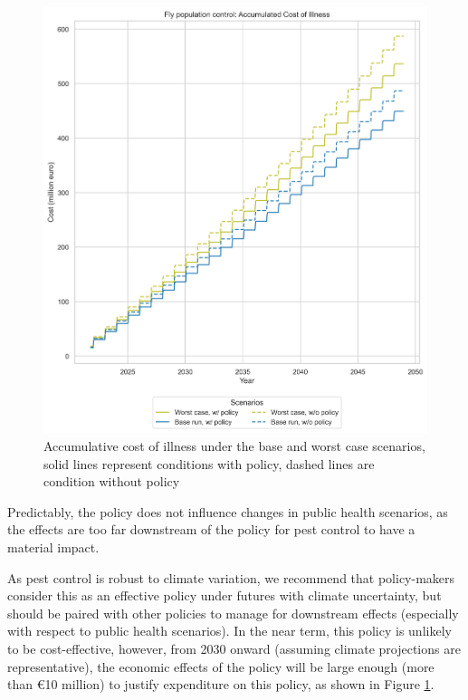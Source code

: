 \begin{figure}[h!]
\begin{minipage}{0.45\textwidth}
    \end{minipage}\hfill
    \begin{minipage}{0.45\textwidth}
        \centering
        \includegraphics[width=1\textwidth]{images/pc_Base and Worst Case_acoi.png} 
        \caption{Accumulative cost of illness under the base and worst case scenarios, solid lines represent conditions with policy, dashed lines are condition without policy}
        \label{fig:pc_bwc_acoi}
    \end{minipage}
\end{figure}

Predictably, the policy does not influence changes in public health scenarios, as the effects are too far downstream of the policy for pest control to have a material impact. 

As pest control is robust to climate variation, we recommend that policy-makers consider this as an effective policy under futures with climate uncertainty, but should be paired with other policies to manage for downstream effects (especially with respect to public health scenarios). In the near term, this policy is unlikely to be cost-effective, however, from 2030 onward (assuming climate projections are representative), the economic effects of the policy will be large enough (more than €10 million) to justify expenditure on this policy, as shown in Figure \ref{fig:pc_bwc_acoi}. 

